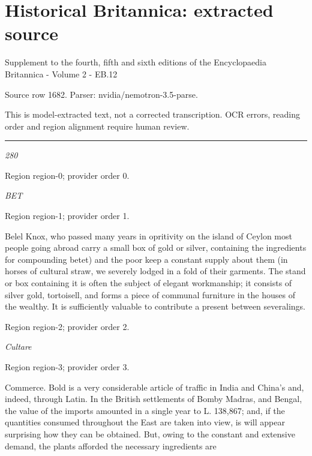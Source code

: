\documentclass[11pt]{article}
\begin{document}
\section*{Historical Britannica: extracted source}
Supplement to the fourth, fifth and sixth editions of the Encyclopaedia Britannica - Volume 2 - EB.12\par
{\small Source row 1682. Parser: nvidia/nemotron-3.5-parse.\par}
{\small This is model-extracted text, not a corrected transcription. OCR errors, reading order and region alignment require human review.\par}
\hrule\medskip
{\small\itshape 280\par}

{\scriptsize\color{gray} Region region-0; provider order 0.\par}
\medskip

{\small\itshape BET\par}

{\scriptsize\color{gray} Region region-1; provider order 1.\par}
\medskip

Belel Knox, who passed many years in opritivity on the island of Ceylon most people going abroad carry a small box of gold or silver, containing the ingredients for compounding betet) and the poor keep a constant supply about them (in horses of cultural straw, we severely lodged in a fold of their garments. The stand or box containing it is often the subject of elegant workmanship; it consists of silver gold, tortoisell, and forms a piece of communal furniture in the houses of the wealthy. It is sufficiently valuable to contribute a present between severalings.
\par

{\scriptsize\color{gray} Region region-2; provider order 2.\par}
\medskip

{\small\itshape Cultare\par}

{\scriptsize\color{gray} Region region-3; provider order 3.\par}
\medskip

Commerce. Bold is a very considerable article of traffic in India and China’s and, indeed, through Latin. In the British settlements of Bomby Madras, and Bengal, the value of the imports amounted in a single year to L. 138,867; and, if the quantities consumed throughout the East are taken into view, is will appear surprising how they can be obtained. But, owing to the constant and extensive demand, the plants afforded the necessary ingredients are
\par
\end{document}
